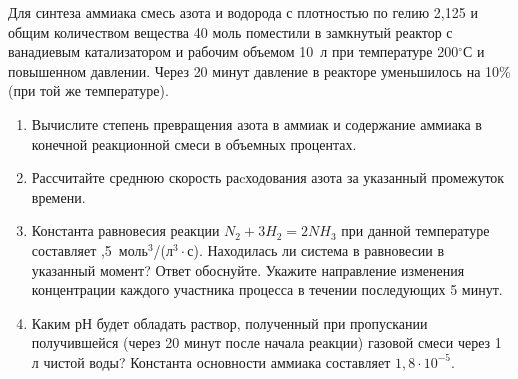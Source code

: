 
Для синтеза аммиака смесь азота и водорода с плотностью по гелию 2,125 и общим количеством вещества 40 моль 
поместили в замкнутый реактор с ванадиевым катализатором и рабочим объемом 10~л при температуре 200$^{\circ}$С и 
повышенном давлении. Через 20 минут давление в реакторе уменьшилось на 10\% (при той же температуре). 

\begin{enumerate}
    \item Вычислите степень превращения азота в аммиак и содержание аммиака в конечной реакционной смеси в 
    объемных процентах.
    \item Рассчитайте среднюю скорость раcходования азота за указанный промежуток времени.
    \item Константа равновесия реакции $N_2 + 3H_2 = 2NH_3$ при данной температуре составляет ,5~моль$^3$/(л$^3 \cdot$с). 
    Находилась ли система в равновесии в указанный момент? Ответ обоснуйте. Укажите направление изменения 
    концентрации каждого участника процесса в течении последующих 5 минут. 
    \item Каким рН будет обладать раствор, полученный при пропускании получившейся (через 20 минут 
    после начала реакции) газовой смеси через 1 л чистой воды? Константа основности аммиака составляет $1,8 \cdot 10^{-5}$.  
\end{enumerate}